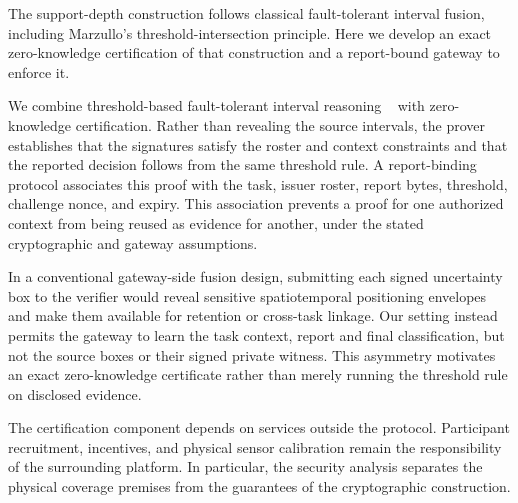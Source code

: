 The support-depth construction follows classical fault-tolerant interval fusion, including Marzullo's threshold-intersection principle. Here we develop an exact zero-knowledge certification of that construction and a report-bound gateway to enforce it.

We combine threshold-based fault-tolerant interval reasoning ~\citep{Marzullo1990,BFTPoLoc,PG,CRSF} with zero-knowledge certification. Rather than revealing the source intervals, the prover establishes that the signatures satisfy the roster and context constraints and that the reported decision follows from the same threshold rule. A report-binding protocol associates this proof with the task, issuer roster, report bytes, threshold, challenge nonce, and expiry. This association prevents a proof for one authorized context from being reused as evidence for another, under the stated cryptographic and gateway assumptions.

In a conventional gateway-side fusion design, submitting each signed uncertainty box to the verifier would reveal sensitive spatiotemporal positioning envelopes and make them available for retention or cross-task linkage. Our setting instead permits the gateway to learn the task context, report and final classification, but not the source boxes or their signed private witness. This asymmetry motivates an exact zero-knowledge certificate rather than merely running the threshold rule on disclosed evidence.

The certification component depends on services outside the protocol. Participant recruitment, incentives, and physical sensor calibration remain the responsibility of the surrounding platform. In particular, the security analysis separates the physical coverage premises from the guarantees of the cryptographic construction.

